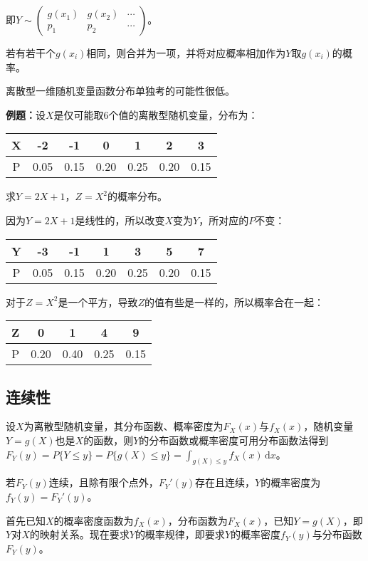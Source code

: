 \documentclass[UTF8, 12pt]{ctexart}
\begin{document}
即$Y\sim\left(\begin{array}{ccc}
    g(x_1) & g(x_2) & \cdots \\
    p_1 & p_2 & \cdots
\end{array}\right)$。

若有若干个$g(x_i)$相同，则合并为一项，并将对应概率相加作为$Y$取$g(x_i)$的概率。

离散型一维随机变量函数分布单独考的可能性很低。

\textbf{例题：}设$X$是仅可能取6个值的离散型随机变量，分布为：\medskip

\begin{tabular}{c|cccccc}
    \hline
    X & -2 & -1 & 0 & 1 & 2 & 3 \\ \hline
    P & 0.05 & 0.15 & 0.20 & 0.25 & 0.20 & 0.15 \\
    \hline
\end{tabular} \medskip

求$Y=2X+1$，$Z=X^2$的概率分布。

因为$Y=2X+1$是线性的，所以改变$X$变为$Y$，所对应的$P$不变：\medskip

\begin{tabular}{c|cccccc}
    \hline
    Y & -3 & -1 & 1 & 3 & 5 & 7 \\ \hline
    P & 0.05 & 0.15 & 0.20 & 0.25 & 0.20 & 0.15 \\
    \hline
\end{tabular} \medskip

对于$Z=X^2$是一个平方，导致$Z$的值有些是一样的，所以概率合在一起：\medskip

\begin{tabular}{c|cccc}
    \hline
    Z & 0 & 1 & 4 & 9 \\ \hline
    P & 0.20 & 0.40 & 0.25 & 0.15 \\
    \hline
\end{tabular}

\subsection{连续性}

设$X$为离散型随机变量，其分布函数、概率密度为$F_X(x)$与$f_X(x)$，随机变量$Y=g(X)$也是$X$的函数，则$Y$的分布函数或概率密度可用分布函数法得到$F_Y(y)=P\{Y\leqslant y\}=P\{g(X)\leqslant y\}=\int_{g(X)\leqslant y}f_X(x)\,\textrm{d}x$。

若$F_Y(y)$连续，且除有限个点外，$F_Y'(y)$存在且连续，$Y$的概率密度为$f_Y(y)=F_Y'(y)$。

首先已知$X$的概率密度函数为$f_X(x)$，分布函数为$F_X(x)$，已知$Y=g(X)$，即$Y$对$X$的映射关系。现在要求$Y$的概率规律，即要求$Y$的概率密度$f_Y(y)$与分布函数$F_Y(y)$。
\end{document}
